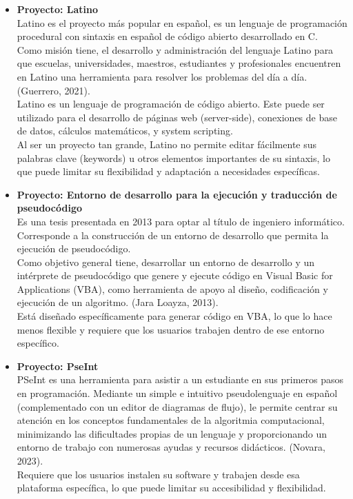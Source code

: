 \vspace{-1em}
\begin{itemize}
  \item \textbf{Proyecto: Latino}\\
  Latino es el proyecto más popular en español, es un lenguaje de programación procedural con sintaxis en español de código abierto desarrollado en C.\\
  Como misión tiene, el desarrollo y administración del lenguaje Latino para que escuelas, universidades, maestros, estudiantes y profesionales encuentren en Latino una herramienta para resolver los problemas del día a día. (Guerrero, 2021).\\
  Latino es un lenguaje de programación de código abierto. Este puede ser utilizado para el desarrollo de páginas web (server-side), conexiones de base de datos, cálculos matemáticos, y system scripting.\\
  Al ser un proyecto tan grande, Latino no permite editar fácilmente sus palabras clave (keywords) u otros elementos importantes de su sintaxis, lo que puede limitar su flexibilidad y adaptación a necesidades específicas.

  \item \textbf{Proyecto: Entorno de desarrollo para la ejecución y traducción de pseudocódigo}\\
  Es una tesis presentada en 2013 para optar al título de ingeniero informático. Corresponde a la construcción de un entorno de desarrollo que permita la ejecución de pseudocódigo.\\
  Como objetivo general tiene, desarrollar un entorno de desarrollo y un intérprete de pseudocódigo que genere y ejecute código en Visual Basic for Applications (VBA), como herramienta de apoyo al diseño, codificación y ejecución de un algoritmo. (Jara Loayza, 2013).\\
  Está diseñado específicamente para generar código en VBA, lo que lo hace menos flexible y requiere que los usuarios trabajen dentro de ese entorno específico.

  \item \textbf{Proyecto: PseInt}\\
  PSeInt es una herramienta para asistir a un estudiante en sus primeros pasos en programación. Mediante un simple e intuitivo pseudolenguaje en español (complementado con un editor de diagramas de flujo), le permite centrar su atención en los conceptos fundamentales de la algoritmia computacional, minimizando las dificultades propias de un lenguaje y proporcionando un entorno de trabajo con numerosas ayudas y recursos didácticos. (Novara, 2023).\\
  Requiere que los usuarios instalen su software y trabajen desde esa plataforma específica, lo que puede limitar su accesibilidad y flexibilidad.
\end{itemize}
\vspace{-1em}

